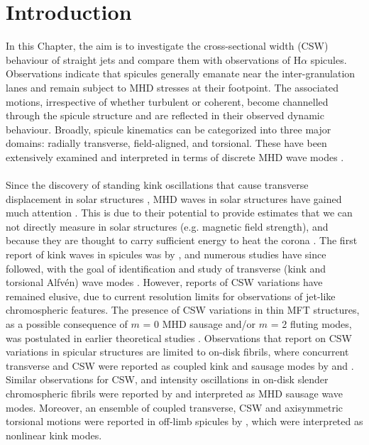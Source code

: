 \documentclass[12pt]{ociamthesis}
\newcommand{\Alfven}{Alfv\'{e}n}
\newcommand{\np}{\\ \\}
\begin{document}
\section{Introduction}
In this Chapter, the aim is to investigate the cross-sectional width (CSW) behaviour of straight jets and compare them with observations of H$\alpha$ spicules. Observations indicate that spicules generally emanate near the inter-granulation lanes and remain subject to MHD stresses at their footpoint. The associated motions, irrespective of whether turbulent or coherent, become channelled through the spicule structure and are reflected in their observed dynamic behaviour. Broadly, spicule kinematics can be categorized into three major domains: radially transverse, field-aligned, and torsional. These have been extensively examined and interpreted in terms of discrete MHD wave modes \citep[see review:][]{Zaqarashvili2009}. \np  
%
Since the discovery of standing kink oscillations that cause transverse displacement in solar structures \citep{Aschwanden1999ApJ520880A, Nakariakov1999Sci285862N, Aschwanden2002SoPh20699A}, MHD waves in solar structures have gained much attention \citep{Cally1985AuJPh38825C, Kudoh1999ApJ514493K, Fujimura2009ApJ7021443F, Zaqarashvili2009, Kuridze2012, Jess2012, Mooroogen2017AA607A46M, Allcock2019FrASS648A}. This is due to their potential to provide estimates that we can not directly measure in solar structures (e.g. magnetic field strength), and because they are thought to carry sufficient energy to heat the corona \citep{Alfv1947MNRAS107211A, Gordon1983ApJ266373G, Poedts2002ESASP505273P, Srivastava2017NatSR743147S}. The first report of kink waves in spicules was by \cite{Kukhianidze2006}, and numerous studies have since followed, with the goal of identification and study of transverse (kink and torsional \Alfven) wave modes \citep{DePontieu2007, Ebadi2014, Pascoe2016AA585L6P, Sharma2017, Tiwari2019ApJ876106T}. However, reports of CSW variations have remained elusive, due to current resolution limits for observations of jet-like chromospheric features. The presence of CSW variations in thin MFT structures, as a possible consequence of $m$ = 0 MHD sausage and/or $m$ = 2 fluting modes, was postulated in earlier theoretical studies \citep{Ziegler1997a, Ziegler1997, Ruderman2010}. Observations that report on CSW variations in spicular structures are limited to on-disk fibrils, where concurrent transverse and CSW were reported as coupled kink and sausage modes by \cite{Jess2012} and \cite{Morton2012}. Similar observations for CSW, and intensity oscillations in on-disk slender chromospheric fibrils were reported by \citet{Gafeira2017} and interpreted as MHD sausage wave modes. Moreover, an ensemble of coupled transverse, CSW and axisymmetric torsional motions were reported in off-limb spicules by \citet{Sharma2018}, which were interpreted as nonlinear kink modes. \np
\end{document}
